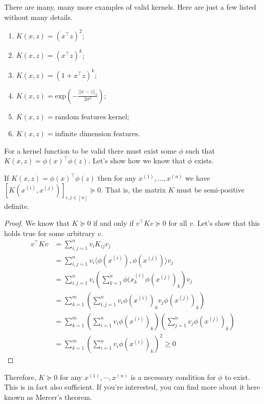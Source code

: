 There are many, many more examples of valid kernels. Here are just a few listed without many details.
\begin{enumerate}
    \item $K(x, z) = (x^\top z)^2$;
    \item $K(x, z) = (x^\top z)^k$;
    \item $K(x, z) = (1 + x^\top z)^k$;
    \item $K(x, z) = \text{exp}\left(-\frac{||x - z||_2}{2\sigma^2}\right)$;
    \item $K(x, z) = \text{random features kernel}$;
    \item $K(x, z) = \text{infinite dimension features}$.
\end{enumerate}


For a kernel function to be valid there must exist some $\phi$ such that $K(x, z) = \phi(x)^\top\phi(z)$. Let's show how we know that $\phi$ exists.
\begin{theorem}
    If $K(x, z) = \phi(x)^\top \phi(z)$ then for any $x^{(1)}, ..., x^{(n)}$ we have $[K(x^{(i)}, x^{(j)})]_{i, j \in [n]} \succeq 0$. That is, the matrix $K$ must be semi-positive definite.
\end{theorem}
\begin{proof} We know that $K \succeq 0$ if and only if $v^\top K v \succeq 0$ for all $v$. Let's show that this holds true for some arbitrary $v$.
\begin{align*}
    v^\intercal K v &= \sum_{i, j=1}^n v_i K_{ij} v_j \\
    &= \sum_{i, j=1}^n v_i \langle \phi(x^{(i)}), \phi(x^{(j)}) \rangle v_j \\
    &= \sum_{i, j=1}^n v_i \left( \sum_{k=1}^n \phi(x^{(i)}_k \phi(x^{(j)})_k \right) v_j \\
    &= \sum_{k=1}^m \left( \sum_{i, j=1}^n v_i \phi(x^{(i)})_k v_j \phi(x^{(j)})_k \right) \\
    &= \sum_{k=1}^m \left( \sum_{i=1}^n v_i \phi(x^{(i)})_k \right) \left( \sum_{j=1}^n v_j \phi(x^{(j)})_k \right) \\
    &= \sum_{k=1}^m \left( \sum_{i=1}^n v_i \phi(x^{(i)})_k \right)^2 \geq 0
\end{align*}
\end{proof}
Therefore, $K \succeq 0$ for any $x^{(1)}, \cdots, x^{(n)}$ is a necessary condition for $\phi$ to exist. This is in fact also sufficient. If you're interested, you can find more about it here \cite{enwiki:987099180} known as Mercer's theorem.